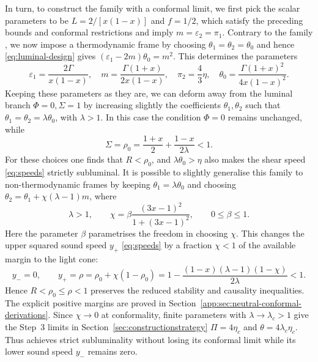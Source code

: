 In turn, to construct the family  with a conformal limit, we first pick the  scalar parameters to be
$L=2/[x(1-x)]$ and $f=1/2$, which satisfy the preceding bounds and
conformal restrictions and imply
$m=\varepsilon_2=\pi_1$. Contrary to the family , we now impose a thermodynamic frame by choosing $\theta_1=\theta_2=\theta_0$ and hence \eqref{eq:luminal-design} gives
$(\varepsilon_1-2m)\theta_0=m^2$. This determines the parameters
\begin{equation}\label{eq:balanced}
 \varepsilon_1=\frac{2\Gamma}{x(1-x)},\quad
 m=\frac{\Gamma(1+x)}{2x(1-x)},\quad \pi_2=\frac43\eta,
 \quad \theta_0=\frac{\Gamma(1+x)^2}{4x(1-x)^2}.
\end{equation}
Keeping these parameters as they are, we can deform away from the luminal branch $\Phi=0,\Sigma=1$ by increasing slightly the coefficients $\theta_1,\theta_2$ such that
$\theta_1=\theta_2=\lambda\theta_0$, with $\lambda>1$. In this case the condition $\Phi=0$ remains unchanged, while
\[
 \Sigma=\rho_0=\frac{1+x}{2}+\frac{1-x}{2\lambda}<1.
\]
For these choices one finds that $R<\rho_0$, and
$\lambda\theta_0>\eta$ also makes the shear speed \eqref{eq:speeds} strictly subluminal. It is possible to slightly generalise this family to non-thermodynamic frames by keeping
$\theta_1=\lambda\theta_0$ and choosing
$\theta_2=\theta_1+\chi(\lambda-1)m$, where
\begin{equation}\label{eq:chi}
 \lambda>1,\qquad
 \chi=\beta\frac{(3x-1)^2}{1+(3x-1)^2},\qquad0\leq\beta\leq1.
\end{equation}
Here the parameter $\beta$ parametrises the freedom in choosing $\chi$. This changes the upper squared sound speed $y_+$ \eqref{eq:speeds} by a fraction $\chi<1$ of
the available margin to the light cone:
\[
 y_-=0,\qquad y_+=\rho=\rho_0+\chi(1-\rho_0)
 =1-\frac{(1-x)(\lambda-1)(1-\chi)}{2\lambda}<1.
\]
Hence $R<\rho_0\leq\rho<1$ preserves the reduced stability and
causality inequalities. The explicit positive margins are proved in
Section~\ref{app:sec:neutral-conformal-derivations}.
Since $\chi\to0$ at conformality, finite parameters with
$\lambda\to\lambda_c>1$ give the Step~3 limits in Section~\ref{sec:constructionstrategy}
$\Pi=4\eta_c$ and $\theta=4\lambda_c\eta_c$.
Thus  achieves strict subluminality without losing its conformal limit while
its lower sound speed $y_-$ remains zero.


